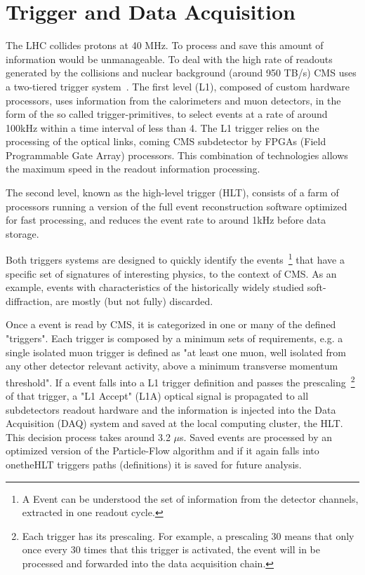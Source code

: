 
\section{Trigger and Data Acquisition}

The LHC collides protons at 40 MHz. To process and save this amount of information would be unmanageable. To deal with the high rate of readouts generated by the collisions and nuclear background (around 950 TB/s) CMS uses a two-tiered trigger system~\cite{Khachatryan:2016bia}. The first level (L1), composed of custom hardware processors, uses information from the calorimeters and muon detectors, in the form of the so called trigger-primitives, to select events at a rate of around 100\unit{kHz} within a time interval of less than 4\mus. The L1 trigger relies on the processing of the optical links, coming CMS subdetector by FPGAs (Field Programmable Gate Array) processors. This combination of technologies allows the maximum speed in the readout information processing.

The second level, known as the high-level trigger (HLT), consists of a farm of processors running a version of the full event reconstruction software optimized for fast processing, and reduces the event rate to around 1\unit{kHz} before data storage.

Both triggers systems are designed to quickly identify the events~\footnote{A Event can be understood the set of information from the detector channels, extracted in one readout cycle.} that have a specific set of signatures of interesting physics, to the context of CMS. As an example, events with characteristics of the historically widely studied soft-diffraction, are mostly (but not fully) discarded. 

Once a event is read by CMS, it is categorized in one or many of the defined "triggers". Each trigger is composed by a minimum sets of requirements, e.g. a single isolated muon trigger is defined as "at least one muon, well isolated from any other detector relevant activity, above a minimum transverse momentum threshold". If a event falls into a L1 trigger definition and passes the prescaling~\footnote{Each trigger has its prescaling. For example, a prescaling 30 means that only once every 30 times that this trigger is activated, the event will in be processed and forwarded into the data acquisition chain.} of that trigger, a "L1 Accept" (L1A) optical signal is propagated to all subdetectors readout hardware and the information is injected into the Data Acquisition (DAQ) system and saved at the local computing cluster, the HLT. This decision process takes around 3.2 $\mu$s. Saved events are processed by an optimized version of the Particle-Flow algorithm and if it again falls into onetheHLT triggers paths (definitions) it is saved for future analysis.